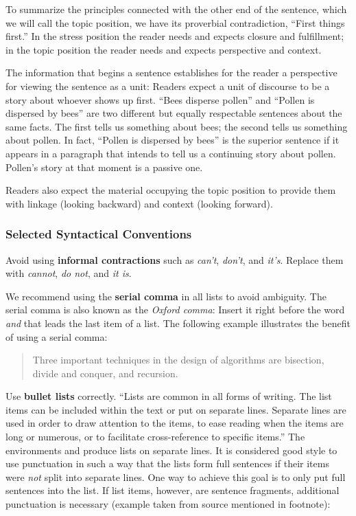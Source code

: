 To summarize the principles connected with the other end of the sentence, which we will call the topic position, we have its proverbial contradiction, “First things first.”
In the stress position the reader needs and expects closure and fulfillment; in the topic position the reader needs and expects perspective and context.

The information that begins a sentence establishes for the reader a perspective for viewing the sentence as a unit: Readers expect a unit of discourse to be a story about whoever shows up first. “Bees disperse pollen” and “Pollen is dispersed by bees” are two different but equally respectable sentences about the same facts. The first tells us something about bees; the second tells us something about pollen. In fact, “Pollen is dispersed by bees” is the superior sentence if it appears in a paragraph that intends to tell us a continuing story about pollen. Pollen’s story at that moment is a passive one.

Readers also expect the material occupying the topic position to provide them with linkage (looking backward) and context (looking forward).

\subsubsection{Selected Syntactical Conventions}

Avoid using \textbf{informal contractions} such as \emph{can't}, \emph{don't}, and \emph{it's}. Replace them with \emph{cannot}, \emph{do not}, and \emph{it is}.

We recommend using the \textbf{serial comma} in all lists to avoid ambiguity. The serial comma is also known as the \emph{Oxford comma}: Insert  it right before the word \emph{and} that leads the last item of a list. The following example%
illustrates the benefit of using a serial comma:
\begin{quote}
  Three important techniques in the design of algorithms are bisection, divide and conquer, and recursion.
\end{quote}

Use \textbf{bullet lists} correctly. ``Lists are common in all forms of writing. The list items can be included within the text or put on separate lines. Separate lines are used in order to draw attention to the items, to ease reading when the items are long or numerous, or to facilitate cross-reference to specific items.'' The environments  and  produce lists on separate lines. It is considered good style to use punctuation in such a way that the lists form full sentences if their items were \emph{not} split into separate lines. One way to achieve this goal is to only put full sentences into the list. If list items, however, are sentence fragments, additional punctuation is necessary (example taken from source mentioned in footnote):


